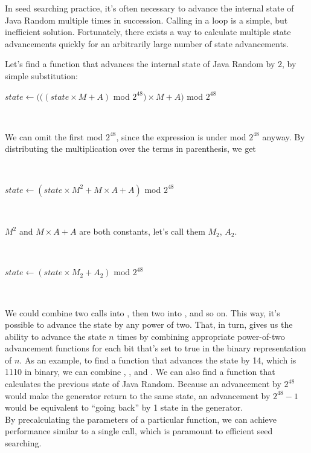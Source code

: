 \documentclass{article}
\begin{document}
In seed searching practice, it’s often necessary to advance the internal state of Java Random multiple times in succession. Calling  in a loop is a simple, but inefficient solution. Fortunately, there exists a way to calculate multiple state advancements quickly for an arbitrarily large number of state advancements.

Let’s find a function that advances the internal state of Java Random by 2, by simple substitution:

\begin{algorithmic}
    \State $state \gets (((state \times M + A)$ mod $2^{48}) \times M + A)$ mod $2^{48}$
\EndFunction
\end{algorithmic}
\ \

\noindent We can omit the first mod $2^{48}$, since the expression is under mod $2^{48}$ anyway. By distributing the multiplication over the terms in parenthesis, we get

\
\begin{algorithmic}
    \State $state \gets (state \times M^2 + M \times A + A)$ mod $2^{48}$
\EndFunction
\end{algorithmic}
\ \

\noindent $M^2$ and $M \times A + A$ are both constants, let’s call them $M_2$, $A_2$.

\
\begin{algorithmic}
\Function{advanceBy2}{} 
    \State $state \gets (state \times M_2 + A_2)$ mod $2^{48}$
\EndFunction
\end{algorithmic}
\ \

We could combine two  calls into , then two  into , and so on. This way, it’s possible to advance the state by any power of two. That, in turn, gives us the ability to advance the state $n$ times by combining appropriate power-of-two advancement functions for each bit that’s set to true in the binary representation of $n$.
As an example, to find a function that advances the state by 14, which is 1110 in binary, we can combine , , and . 
We can also find a function that calculates the previous state of Java Random. Because an advancement by $2^{48}$ would make the generator return to the same state, an advancement by $2^{48}-1$ would be equivalent to “going back” by 1 state in the generator. \\
By precalculating the parameters of a particular \Call{advanceByN}{} function, we can achieve performance similar to a single \Call{nextSeed}{} call, which is paramount to efficient seed searching.
\end{document}
